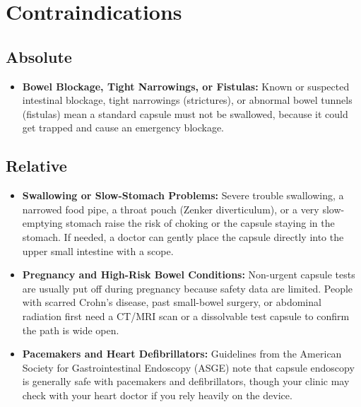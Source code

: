 \section{Contraindications}

\subsection{Absolute}
\begin{itemize}
    \item \textbf{Bowel Blockage, Tight Narrowings, or Fistulas:} Known or suspected intestinal blockage, tight narrowings (strictures), or abnormal bowel tunnels (fistulas) mean a standard capsule must not be swallowed, because it could get trapped and cause an emergency blockage.
\end{itemize}

\subsection{Relative}
\begin{itemize}
    \item \textbf{Swallowing or Slow-Stomach Problems:} Severe trouble swallowing, a narrowed food pipe, a throat pouch (Zenker diverticulum), or a very slow-emptying stomach raise the risk of choking or the capsule staying in the stomach. If needed, a doctor can gently place the capsule directly into the upper small intestine with a scope.
    \item \textbf{Pregnancy and High-Risk Bowel Conditions:} Non-urgent capsule tests are usually put off during pregnancy because safety data are limited. People with scarred Crohn's disease, past small-bowel surgery, or abdominal radiation first need a CT/MRI scan or a dissolvable test capsule to confirm the path is wide open.
    \item \textbf{Pacemakers and Heart Defibrillators:} Guidelines from the American Society for Gastrointestinal Endoscopy (ASGE) note that capsule endoscopy is generally safe with pacemakers and defibrillators, though your clinic may check with your heart doctor if you rely heavily on the device.
\end{itemize}

